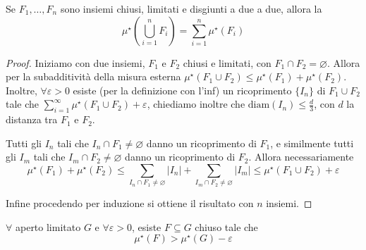 \begin{proposition}\label{prop:prop_2}
    Se \(F_{1}, \dots, F_{n}\) sono insiemi chiusi, limitati e disgiunti a due a
    due, allora la \[\mu^\star \left( \bigcup_{i = 1}^{n}F_{i}  \right) = \sum_{i=1}^{n}
    \mu^{\star}(F_{i})\]
\end{proposition}
\begin{proof}
    Iniziamo con due insiemi, \(F_{1}\) e \(F_{2}\) chiusi e limitati, con
    \(F_{1} \cap F_{2} = \varnothing\). Allora per la subadditività della misura
    esterna \(\mu^{\star}(F_{1} \cup F_{2}) \le \mu^{\star}(F_{1}) +
    \mu^{\star}(F_{2})\). Inoltre, \(\forall \varepsilon > 0\) esiste (per la
    definizione con l'inf) un
    ricoprimento \(\{I_{n}\} \) di \(F_{1}\cup F_{2}\) tale che
    \(\sum_{i=1}^{\infty} \mu^\star\left( F_{1} \cup F_{2} \right) +
    \varepsilon\), chiediamo inoltre che \(\text{diam}(I_{n}) \le \frac{d}{3}\),
    con \(d\) la distanza tra \(F_{1}\) e \(F_{2}\).

    Tutti gli \(I_{n}\) tali che \(I_{n} \cap F_{1} \neq \varnothing\) danno un
    ricoprimento di \(F_{1}\), e similmente tutti gli \(I_{m}\) tali che \(I_{m}
    \cap F_{2} \neq\varnothing\) danno un ricoprimento di \(F_{2}\). Allora
    necessariamente \[\mu^\star(F_{1}) + \mu^\star(F_{2}) \le \sum_{I_{n}\cap
    F_{1}\neq\varnothing} |I_{n}| + \sum_{I_{m}\cap F_{2}\neq\varnothing}
|I_{m}| \le \mu^\star(F_{1} \cup F_{2}) + \varepsilon\]

    Infine procedendo per induzione si ottiene il risultato con \(n\) insiemi.
\end{proof}
\begin{proposition}\label{prop:reticolazione}
    \(\forall \) aperto limitato \(G\) e \(\forall \varepsilon > 0\), esiste \(F
    \subseteq G \) chiuso tale che 
    \[
        \mu^\star(F) > \mu^\star(G) - \varepsilon
    \]
\end{proposition}
